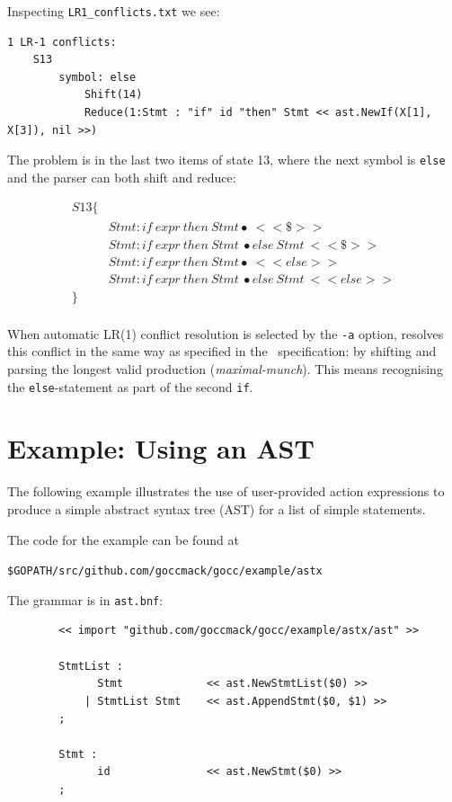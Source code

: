 \documentclass[12pt]{article}
\begin{document}
	Inspecting \verb|LR1_conflicts.txt| we see:

	\begin{verbatim}
1 LR-1 conflicts: 
    S13
        symbol: else
            Shift(14)
            Reduce(1:Stmt : "if" id "then" Stmt	<< ast.NewIf(X[1], X[3]), nil >>)	
	\end{verbatim}
	

	The problem is in the last two items of state 13, where the next symbol is \verb|else| and the parser can both shift and reduce:

	\[
		\begin{array}{ll}
			S13 \{ \\
			  & Stmt : if\ expr\ then\ Stmt\bullet\ <<\$>> \\
			  & Stmt : if\ expr\ then\ Stmt\ \bullet else\ Stmt\ <<\$>> \\
			  & Stmt : if\ expr\ then\ Stmt \bullet\ <<else>> \\
			  & Stmt : if\ expr\ then\ Stmt\ \bullet else\ Stmt\ <<else>> \\
			\} \\
		\end{array}
	\]

	When automatic LR(1) conflict resolution is selected by the \verb|-a| option, \gocc resolves this conflict in the same way as specified in the \Clang\ specification: by shifting and parsing the longest valid production ({\em maximal-munch}). This means recognising the \verb|else|-statement as part of the second \verb|if|.

\section{Example: Using an AST} \label{sec:example ast}
	The following example illustrates the use of user-provided action expressions to produce a simple abstract syntax tree (AST) for a list of simple statements.

	The code for the example can be found at

	\verb|$GOPATH/src/github.com/goccmack/gocc/example/astx|

	The grammar is in \verb|ast.bnf|:

	\begin{verbatim}
		<< import "github.com/goccmack/gocc/example/astx/ast" >>

		StmtList :
		      Stmt             << ast.NewStmtList($0) >>
		    | StmtList Stmt    << ast.AppendStmt($0, $1) >>
		;

		Stmt :
		      id               << ast.NewStmt($0) >>
		;
	\end{verbatim}
\end{document}
